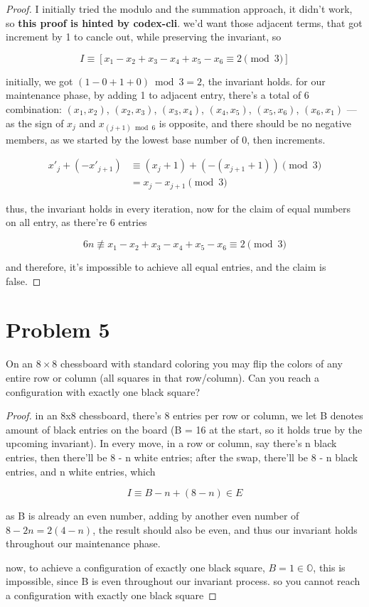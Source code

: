 \begin{proof}
I initially tried the modulo and the summation approach, it
didn't work, so \textbf{this proof is hinted by codex-cli}.
we'd want those adjacent terms, that got increment by 1 to
cancle out, while preserving the invariant, so

\[
    I \equiv [x_1 - x_2 + x_3 - x_4 + x_5 - x_6 \equiv 2 \pmod 3]
\]

initially, we got $(1 - 0 + 1 + 0) \bmod 3 = 2$, the invariant
holds. for our maintenance phase, by adding 1 to adjacent
entry, there's a total of 6 combination: $(x_1, x_2)$, $(x_2,
x_3)$, $(x_3, x_4)$, $(x_4, x_5)$, $(x_5, x_6)$, $(x_6,
x_1)$ --- as the sign of $x_j$ and $x_{(j + 1) \bmod 6}$
is opposite, and there should be no negative members, as we
started by the lowest base number of 0, then increments.

\[
\begin{aligned}
x'_j + (-x'_{j+1}) &\equiv (x_j + 1) + (-(x_{j+1} + 1)) \pmod
3\\
&= x_j - x_{j+1} \pmod 3
\end{aligned}
\]

thus, the invariant holds in every iteration, now for the
claim of equal numbers on all entry, as there're 6 entries

\[
6n \not\equiv x_1 - x_2 + x_3 - x_4 + x_5 - x_6 \equiv 2
\pmod 3
\]

and therefore, it's impossible to achieve all equal entries,
and the claim is false.
\end{proof}

\vspace{1em}
\hrulefill

\section*{Problem 5}
On an $8 \times 8$ chessboard with standard coloring you may flip the colors of any entire row or column (all squares in that row/column). Can you reach a configuration with exactly one black square?

\medskip
\solution

\begin{proof}
in an 8x8 chessboard, there's 8 entries per row or column,
we let B denotes amount of black entries on the board (B = 16
at the start, so it holds true by the upcoming invariant). In
every move, in a row or column, say there's n black entries,
then there'll be 8 - n white entries; after the swap,
there'll be 8 - n black entries, and n white entries, which

\[
I \equiv B - n + (8 - n) \in E
\]

as B is already an even number, adding by another even number
of $8 - 2n = 2(4 - n)$, the result should also be even, and
thus our invariant holds throughout our maintenance phase.

\vspace{1em}

now, to achieve a configuration of exactly one black square,
$B = 1 \in \mathbb{O}$, this is impossible, since B is even
throughout our invariant process. so you cannot reach a
configuration with exactly one black square
\end{proof}

